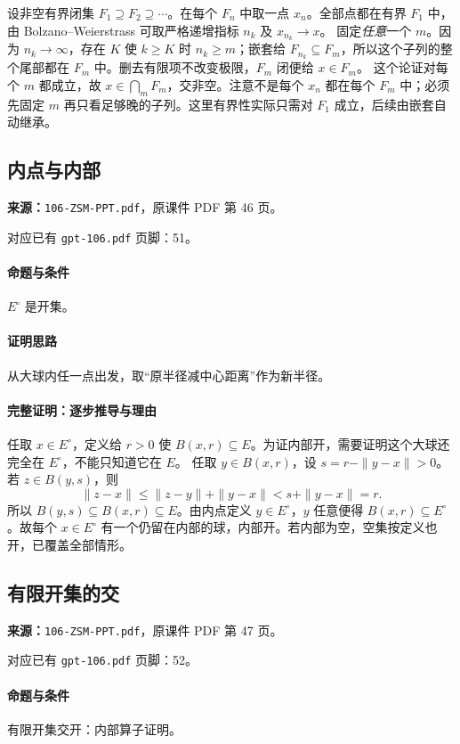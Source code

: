 设非空有界闭集 $F_1\supseteq F_2\supseteq\cdots$。在每个 $F_n$ 中取一点 $x_n$。全部点都在有界 $F_1$ 中，由 Bolzano--Weierstrass 可取严格递增指标 $n_k$ 及 $x_{n_k}\to x$。
固定\emph{任意}一个 $m$。因为 $n_k\to\infty$，存在 $K$ 使 $k\ge K$ 时 $n_k\ge m$；嵌套给 $F_{n_k}\subseteq F_m$，所以这个子列的整个尾部都在 $F_m$ 中。删去有限项不改变极限，$F_m$ 闭便给 $x\in F_m$。
这个论证对每个 $m$ 都成立，故 $x\in\bigcap_mF_m$，交非空。注意不是每个 $x_n$ 都在每个 $F_m$ 中；必须先固定 $m$ 再只看足够晚的子列。这里有界性实际只需对 $F_1$ 成立，后续由嵌套自动继承。

\clearpage\subsection{内点与内部}
\textbf{来源：}\texttt{106-ZSM-PPT.pdf}，原课件 PDF 第 46 页。\par
对应已有 \texttt{gpt-106.pdf} 页脚：51。\par
\paragraph{命题与条件}$E^\circ$ 是开集。
\paragraph{证明思路}从大球内任一点出发，取“原半径减中心距离”作为新半径。
\paragraph{完整证明：逐步推导与理由}

任取 $x\in E^\circ$，定义给 $r>0$ 使 $B(x,r)\subseteq E$。为证内部开，需要证明这个大球还完全在 $E^\circ$，不能只知道它在 $E$。
任取 $y\in B(x,r)$，设 $s=r-\|y-x\|>0$。若 $z\in B(y,s)$，则
\[\|z-x\|\le\|z-y\|+\|y-x\|<s+\|y-x\|=r.\]
所以 $B(y,s)\subseteq B(x,r)\subseteq E$。由内点定义 $y\in E^\circ$，$y$ 任意便得 $B(x,r)\subseteq E^\circ$。故每个 $x\in E^\circ$ 有一个仍留在内部的球，内部开。若内部为空，空集按定义也开，已覆盖全部情形。

\clearpage\subsection{有限开集的交}
\textbf{来源：}\texttt{106-ZSM-PPT.pdf}，原课件 PDF 第 47 页。\par
对应已有 \texttt{gpt-106.pdf} 页脚：52。\par
\paragraph{命题与条件}有限开集交开：内部算子证明。
